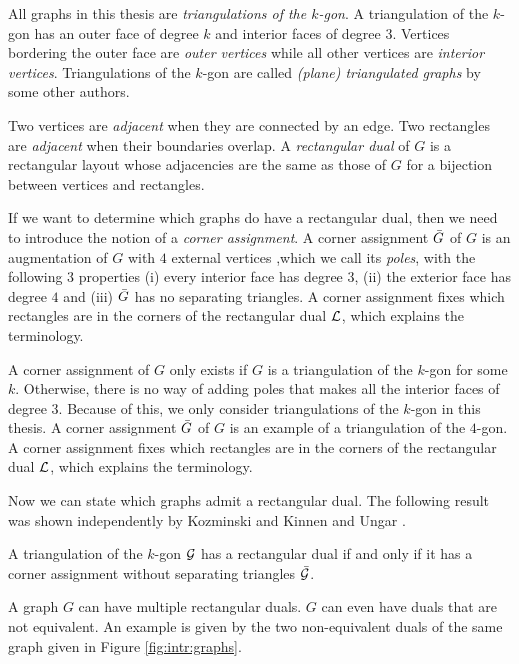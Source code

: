   All graphs in this thesis are \emph{triangulations of the $k$-gon}. A triangulation of the $k$-gon has an outer face of degree $k$ and interior faces of degree $3$.
  Vertices bordering the outer face are \emph{outer vertices} while all other vertices are \emph{interior vertices}.
  Triangulations of the $k$-gon are called \emph{(plane) triangulated graphs} by some other authors.

  Two vertices are \emph{adjacent} when they are connected by an edge. Two rectangles are \emph{adjacent} when their boundaries overlap. A \emph{rectangular dual} of $G$ is a rectangular layout whose adjacencies are the same as those of $G$ for a bijection between vertices and rectangles.

  If we want to determine which graphs do have a rectangular dual, then we need to introduce the notion of a \emph{corner assignment}.
  A corner assignment $\bar{G}$ of $G$ is an augmentation of $G$ with $4$ external vertices ,which we call its \emph{poles}, with the following 3 properties (i) every interior face has degree $3$, (ii) the exterior face has degree $4$ and (iii) $\bar{G}$ has no separating triangles.
  A corner assignment fixes which rectangles are in the corners of the rectangular dual $\mathcal{L}$, which explains the terminology.

  A corner assignment of $G$ only exists if $G$ is a triangulation of the $k$-gon for some $k$. Otherwise, there is no way of adding poles that makes all the interior faces of degree $3$. Because of this, we only consider triangulations of the $k$-gon in this thesis. A corner assignment $\bar{G}$ of $G$ is an example of a triangulation of the $4$-gon. A corner assignment fixes which rectangles are in the corners of the rectangular dual $\mathcal{L}$, which explains the terminology.

  Now we can state which graphs admit a rectangular dual. The following result was shown independently by Kozminski and Kinnen \cite{Kozminski1984} and Ungar \cite{Ungar1953}.

  \begin{thrm}
    \label{th:rect:exsitenceREctangularDual}
    A triangulation of the $k$-gon $\mathcal{G}$ has a rectangular dual if and only if it has a corner assignment without separating triangles $\bar{\mathcal{G}}$.
  \end{thrm}

  A graph $G$ can have multiple rectangular duals. $G$ can even have duals that are not equivalent. An example is given by the two non-equivalent duals of the same graph given in Figure \ref{fig:intr:graphs}.

